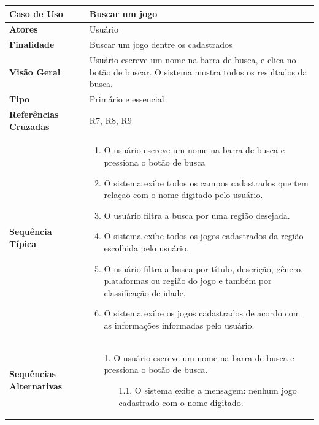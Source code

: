 \documentclass[a4paper,11pt]{article}
\begin{document}
\begin{table}[H]
		\begin{tabularx}{\textwidth}{|l|X|}
		\hline
			\textbf{Caso de Uso} &  Buscar um jogo \\ \hline
			\textbf{Atores} &  Usuário  \\ \hline
			\textbf{Finalidade} &   Buscar um jogo dentre os cadastrados  \\ \hline
			\textbf{Visão Geral} &  Usuário escreve um nome na barra de busca, e clica no botão
de buscar. O sistema mostra todos os resultados da busca.  \\ \hline
			\textbf{Tipo} &   Primário e essencial \\ \hline
			\textbf{Referências Cruzadas} &   R7, R8, R9 \\ \hline
			\textbf{Sequência Típica} & 
			
			\begin{enumerate}
			\item O usuário escreve um nome na barra de busca e pressiona o botão de busca
			
			\item O sistema exibe todos os campos cadastrados que tem relaçao com o nome digitado pelo usuário.
			
			\item O usuário filtra a busca por uma região desejada.
			
			\item O sistema exibe todos os jogos cadastrados da região escolhida pelo usuário.
			
			\item O usuário filtra a busca por título, descrição, gênero, plataformas ou região do jogo e também por classificação de idade.
			
			\item O sistema exibe os jogos cadastrados de acordo com as informações informadas pelo usuário.
			\end{enumerate} \\ \hline
			
			
			\textbf{Sequências Alternativas} & 
						
			\begin{itemize}
				\item[1.] O usuário escreve um nome na barra de busca e pressiona o botão de busca.
				\begin{itemize}
					\item[1.1.] O sistema exibe a mensagem: nenhum jogo cadastrado com o nome digitado.
				\end{itemize}
				

\end{itemize}
\end{tabularx}
\end{table}
\end{document}
